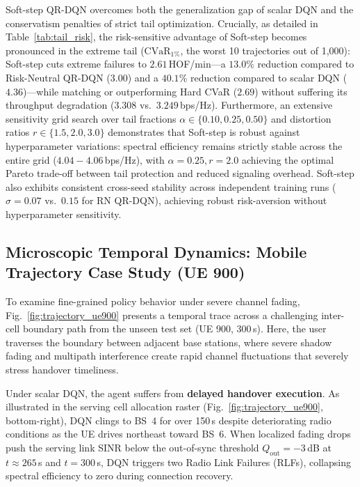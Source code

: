 \documentclass{ieeetmlcn}
\begin{document}
Soft-step QR-DQN overcomes both the generalization gap of scalar DQN and the conservatism penalties of strict tail optimization. Crucially, as detailed in Table~\ref{tab:tail_risk}, the risk-sensitive advantage of Soft-step becomes pronounced in the extreme tail ($\mathrm{CVaR}_{1\%}$, the worst 10 trajectories out of 1,000): Soft-step cuts extreme failures to $2.61$\,HOF/min---a $13.0\%$ reduction compared to Risk-Neutral QR-DQN ($3.00$) and a $40.1\%$ reduction compared to scalar DQN ($4.36$)---while matching or outperforming Hard CVaR ($2.69$) without suffering its throughput degradation ($3.308$ vs.\ $3.249$\,bps/Hz). Furthermore, an extensive sensitivity grid search over tail fractions $\alpha \in \{0.10, 0.25, 0.50\}$ and distortion ratios $r \in \{1.5, 2.0, 3.0\}$ demonstrates that Soft-step is robust against hyperparameter variations: spectral efficiency remains strictly stable across the entire grid ($4.04 - 4.06$\,bps/Hz), with $\alpha=0.25, r=2.0$ achieving the optimal Pareto trade-off between tail protection and reduced signaling overhead. Soft-step also exhibits consistent cross-seed stability across independent training runs ($\sigma = 0.07$ vs.\ $0.15$ for RN QR-DQN), achieving robust risk-aversion without hyperparameter sensitivity.



\subsection{Microscopic Temporal Dynamics: Mobile Trajectory Case Study (UE 900)}
\label{sec:results-trajectory}
To examine fine-grained policy behavior under severe channel fading, Fig.~\ref{fig:trajectory_ue900} presents a temporal trace across a challenging inter-cell boundary path from the unseen test set (UE 900, 300\,s). Here, the user traverses the boundary between adjacent base stations, where severe shadow fading and multipath interference create rapid channel fluctuations that severely stress handover timeliness.

Under scalar DQN, the agent suffers from \textbf{delayed handover execution}. As illustrated in the serving cell allocation raster (Fig.~\ref{fig:trajectory_ue900}, bottom-right), DQN clings to BS~4 for over 150\,s despite deteriorating radio conditions as the UE drives northeast toward BS~6. When localized fading drops push the serving link SINR below the out-of-sync threshold $Q_{\text{out}} = -3$\,dB at $t \approx 265$\,s and $t = 300$\,s, DQN triggers two Radio Link Failures (RLFs), collapsing spectral efficiency to zero during connection recovery.
\end{document}
